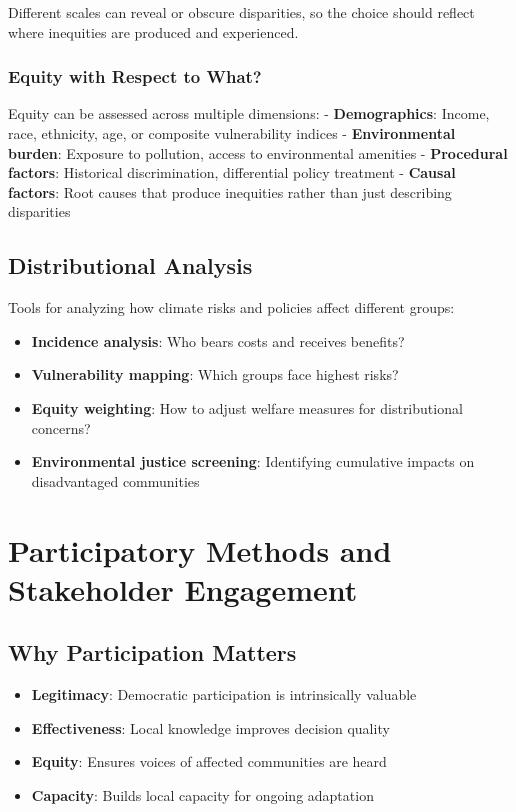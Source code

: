 \documentclass[
  letterpaper,
  DIV=11,
  numbers=noendperiod]{scrreprt}
\providecommand{\tightlist}{%
  \setlength{\itemsep}{0pt}\setlength{\parskip}{0pt}}
\begin{document}
Different scales can reveal or obscure disparities, so the choice should
reflect where inequities are produced and experienced.

\subsubsection{Equity with Respect to
What?}\label{equity-with-respect-to-what}

Equity can be assessed across multiple dimensions: -
\textbf{Demographics}: Income, race, ethnicity, age, or composite
vulnerability indices - \textbf{Environmental burden}: Exposure to
pollution, access to environmental amenities - \textbf{Procedural
factors}: Historical discrimination, differential policy treatment -
\textbf{Causal factors}: Root causes that produce inequities rather than
just describing disparities

\subsection{Distributional Analysis}\label{distributional-analysis}

Tools for analyzing how climate risks and policies affect different
groups:

\begin{itemize}
\tightlist
\item
  \textbf{Incidence analysis}: Who bears costs and receives benefits?
\item
  \textbf{Vulnerability mapping}: Which groups face highest risks?
\item
  \textbf{Equity weighting}: How to adjust welfare measures for
  distributional concerns?
\item
  \textbf{Environmental justice screening}: Identifying cumulative
  impacts on disadvantaged communities
\end{itemize}

\section{Participatory Methods and Stakeholder
Engagement}\label{participatory-methods-and-stakeholder-engagement}

\subsection{Why Participation Matters}\label{why-participation-matters}

\begin{itemize}
\tightlist
\item
  \textbf{Legitimacy}: Democratic participation is intrinsically
  valuable
\item
  \textbf{Effectiveness}: Local knowledge improves decision quality
\item
  \textbf{Equity}: Ensures voices of affected communities are heard
\item
  \textbf{Capacity}: Builds local capacity for ongoing adaptation
\end{itemize}
\end{document}
